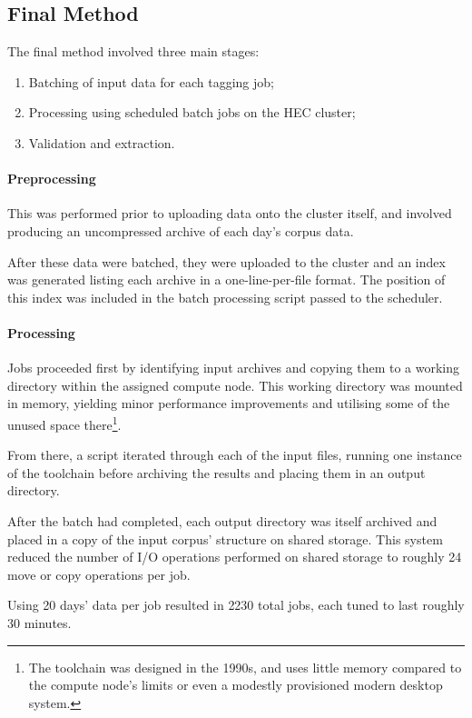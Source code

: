 \subsection{Final Method}
The final method involved three main stages:

\begin{enumerate}
    \item Batching of input data for each tagging job;
    \item Processing using scheduled batch jobs on the HEC cluster;
    \item Validation and extraction.
\end{enumerate}


\paragraph{Preprocessing}
This was performed prior to uploading data onto the cluster itself, and involved producing an uncompressed  archive of each day's corpus data.

After these data were batched, they were uploaded to the cluster and an index was generated listing each archive in a one-line-per-file format.  The position of this index was included in the batch processing script passed to the scheduler.


\paragraph{Processing}
Jobs proceeded first by identifying input archives and copying them to a working directory within the assigned compute node.  This working directory was mounted in memory, yielding minor performance improvements and utilising some of the unused space there\footnote{The toolchain was designed in the 1990s, and uses little memory compared to the compute node's limits or even a modestly provisioned modern desktop system.}.

From there, a script iterated through each of the input files, running one instance of the toolchain before archiving the results and placing them in an output directory.

After the batch had completed, each output directory was itself archived and placed in a copy of the input corpus' structure on shared storage.  This system reduced the number of I/O operations performed on shared storage to roughly 24 move or copy operations per job.

Using 20 days' data per job resulted in 2230 total jobs, each tuned to last roughly 30 minutes.


